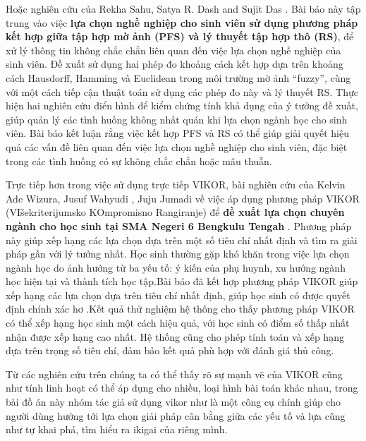 Hoặc nghiên cứu của Rekha Sahu, Satya R. Dash and Sujit Das \cite{rekha}. Bài báo này tập trung vào việc \textbf{lựa chọn nghề nghiệp cho sinh viên sử dụng phương pháp kết hợp giữa tập hợp mờ ảnh (PFS) và lý thuyết tập hợp thô (RS)}, để xử lý thông tin không chắc chắn liên quan đến việc lựa chọn nghề nghiệp của sinh viên. Đề xuất sử dụng hai phép đo khoảng cách kết hợp dựa trên khoảng cách Hausdorff, Hamming và Euclidean trong môi trường mờ ảnh “fuzzy”, cùng với một cách tiếp cận thuật toán sử dụng các phép đo này và lý thuyết RS. Thực hiện hai nghiên cứu điển hình để kiểm chứng tính khả dụng của ý tưởng đề xuất, giúp quản lý các tình huống không nhất quán khi lựa chọn ngành học cho sinh viên. Bài báo kết luận rằng việc kết hợp PFS và RS có thể giúp giải quyết hiệu quả các vấn đề liên quan đến việc lựa chọn nghề nghiệp cho sinh viên, đặc biệt trong các tình huống có sự không chắc chắn hoặc mâu thuẫn.

Trực tiếp hơn trong việc sử dụng trực tiếp VIKOR, bài nghiên cứu của Kelvin Ade Wizura, Jusuf Wahyudi , Juju Jumadi về việc áp dụng phương pháp VIKOR (VIšekriterijumsko KOmpromisno Rangiranje) để \textbf{đề xuất lựa chọn chuyên ngành cho học sinh tại SMA Negeri 6 Bengkulu Tengah} \cite{kelvin}. Phương pháp này giúp xếp hạng các lựa chọn dựa trên một số tiêu chí nhất định và tìm ra giải pháp gần với lý tưởng nhất. Học sinh thường gặp khó khăn trong việc lựa chọn ngành học do ảnh hưởng từ ba yếu tố: ý kiến của phụ huynh, xu hướng ngành học hiện tại và thành tích học tập.Bài báo đã kết hợp phương pháp VIKOR giúp xếp hạng các lựa chọn dựa trên tiêu chí nhất định, giúp học sinh có được quyết định chính xác hơ .Kết quả thử nghiệm hệ thống cho thấy phương pháp VIKOR có thể xếp hạng học sinh một cách hiệu quả, với học sinh có điểm số thấp nhất nhận được xếp hạng cao nhất. Hệ thống cũng cho phép tính toán và xếp hạng dựa trên trọng số tiêu chí, đảm bảo kết quả phù hợp với đánh giá thủ công.

Từ các nghiên cứu trên chúng ta có thể thấy rõ sự mạnh vẽ của VIKOR cũng như tính linh hoạt có thể áp dụng cho nhiều, loại hình bài toán khác nhau, trong bài đồ án này nhóm tác giả sử dụng vikor như là một công cụ chính giúp cho người dùng hướng tới lựa chọn giải pháp cân bằng giữa các yếu tố và lựa cũng như tự khai phá, tìm hiểu ra ikigai của riêng mình.

